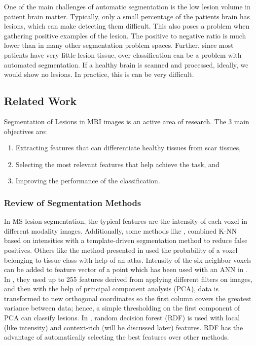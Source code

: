 \documentclass{article} %
\begin{document}
One of the main challenges of automatic segmentation is the low lesion volume in patient brain matter. Typically, only a small percentage of the patients brain has lesions, which can make detecting them difficult. This also poses a problem when gathering positive examples of the lesion. The positive to negative ratio is much lower than in many other segmentation problem spaces. Further, since most patients have very little lesion tissue, over classification can be a problem with automated segmentation. If a healthy brain is scanned and processed, ideally, we would show no lesions. In practice, this is can be very difficult.


\subsection{Related Work}
Segmentation of Lesions in MRI images is an active area of research. The 3 main objectives are: 
\begin{enumerate}
  \item Extracting features that can differentiate healthy tissues from scar tissues, 
  \item Selecting the most relevant features that help achieve the task, and
  \item Improving the performance of the classification.
\end{enumerate} 

\subsubsection{Review of Segmentation Methods}
In MS lesion segmentation, the typical features are the intensity of each voxel in different modality images. Additionally, some methods like  \cite{commowick2009continuous}, combined K-NN based on intensities with a template-driven segmentation method to reduce false positives. Others like the method presented in \cite{zijdenbos2002automatic} used the probability of a voxel belonging to tissue class with help of an atlas. Intensity of the six neighbor voxels can be added to feature vector of a point which has been used with an ANN in \cite{younis2007ms}. In \cite{kroon2008multiple}, they used up to 255 features derived from applying different filters on images, and then with the help of principal component analysis (PCA), data is transformed to new orthogonal coordinates so the first column covers the greatest variance between data; hence, a simple thresholding on the first component of PCA can classify lesions. In \cite{geremia2011spatial}, random decision forest (RDF) is used with local (like intensity) and context-rich (will be discussed later) features. RDF has the advantage of automatically selecting the best features over other methods.
\end{document}
